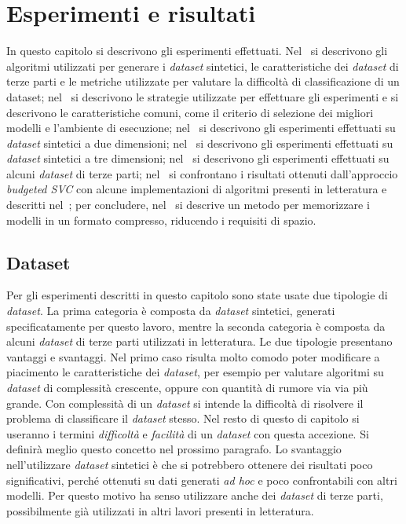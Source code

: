 \chapter{Esperimenti e risultati}
\label{chap:esperimenti}
In questo capitolo si descrivono gli esperimenti effettuati.
Nel~ si descrivono gli algoritmi utilizzati per generare i \emph{dataset} sintetici, le caratteristiche dei \emph{dataset} di terze parti e le metriche utilizzate per valutare la difficoltà di classificazione di un dataset;
nel~ si descrivono le strategie utilizzate per effettuare gli esperimenti e si descrivono le caratteristiche comuni, come il criterio di selezione dei migliori modelli e l'ambiente di esecuzione;
nel~ si descrivono gli esperimenti effettuati su \emph{dataset} sintetici a due dimensioni;
nel~ si descrivono gli esperimenti effettuati su \emph{dataset} sintetici a tre dimensioni;
nel~ si descrivono gli esperimenti effettuati su alcuni \emph{dataset} di terze parti;
nel~ si confrontano i risultati ottenuti dall'approccio \emph{budgeted SVC} con alcune implementazioni di algoritmi presenti in letteratura e descritti nel~; per concludere, nel~ si descrive un metodo per memorizzare i modelli in un formato compresso, riducendo i requisiti di spazio. 

\section{Dataset}\label{sec:exp:dataset}
Per gli esperimenti descritti in questo capitolo sono state usate due tipologie di \emph{dataset}. 
La prima categoria è composta da \emph{dataset} sintetici, generati specificatamente per questo lavoro, mentre la seconda categoria è composta da alcuni \emph{dataset} di terze parti utilizzati in letteratura. 
Le due tipologie presentano vantaggi e svantaggi. Nel primo caso risulta molto comodo poter modificare a piacimento le caratteristiche dei \emph{dataset}, per esempio per valutare algoritmi su \emph{dataset} di complessità crescente, oppure con quantità di rumore via via più grande.
Con complessità di un \emph{dataset} si intende la difficoltà di risolvere il problema di classificare il \emph{dataset} stesso. Nel resto di questo di capitolo si useranno i termini \emph{difficoltà} e \emph{facilità} di un \emph{dataset} con questa accezione.
Si definirà meglio questo concetto nel prossimo paragrafo.
Lo svantaggio nell'utilizzare \emph{dataset} sintetici è che si potrebbero ottenere dei risultati poco significativi, perché ottenuti su dati generati \emph{ad hoc} e poco confrontabili con altri modelli. 
Per questo motivo ha senso utilizzare anche dei \emph{dataset} di terze parti, possibilmente già utilizzati in altri lavori presenti in letteratura.

